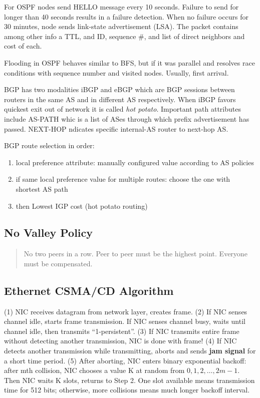 For OSPF nodes send HELLO message every 10 seconds. Failure to send for
longer than 40 seconds results in a failure detection. When no failure
occurs for 30 minutes, node sends link-state advertisement (LSA). The
packet contains among other info a TTL, and ID, sequence \#, and list of
direct neighbors and cost of each.

Flooding in OSPF behaves similar to BFS, but if it was parallel and
resolves race conditions with sequence number and visited nodes.
Usually, first arrival.

BGP has two modalities iBGP and eBGP which are BGP sessions between
routers in the same AS and in different AS respectively. When iBGP
favors quickest exit out of network it is called \textit{hot potato}.
Important path attributes include AS-PATH whic is a list of ASes through
which prefix advertisement has passed. NEXT-HOP ndicates specific
internal-AS router to next-hop AS.

BGP route selection in order:
\begin{scriptsize}
  \begin{enumerate}[itemsep=0em]
    \item local preference attribute: manually configured value according to AS policies
    \item if same local preference value for multiple routes: choose the one with shortest AS path
    \item then Lowest IGP cost (hot potato routing)
  \end{enumerate}
\end{scriptsize}
\subsection{No Valley Policy}
\blockquote{
  No two peers in a row. Peer to peer must be the highest point. Everyone must be compensated.
}
\subsection{Ethernet CSMA/CD Algorithm}
(1) NIC receives datagram from network layer, creates frame. (2) If NIC
senses channel idle, starts frame transmission. If NIC senses channel
busy, waits until channel idle, then transmits ``1-persistent''. (3) If
NIC transmits entire frame without detecting another transmission, NIC
is done with frame! (4) If NIC detects another transmission while
transmitting, aborts and sends \textbf{jam signal} for a short time
period. (5) After aborting, NIC enters binary exponential backoff: after
mth collision, NIC chooses a value K at random from ${0,1,2,\dots, 2m -
1}$. Then NIC waits K slots, returns to Step 2. One slot available means
transmission time for 512 bits; otherwise, more collisions means much
longer backoff interval.
